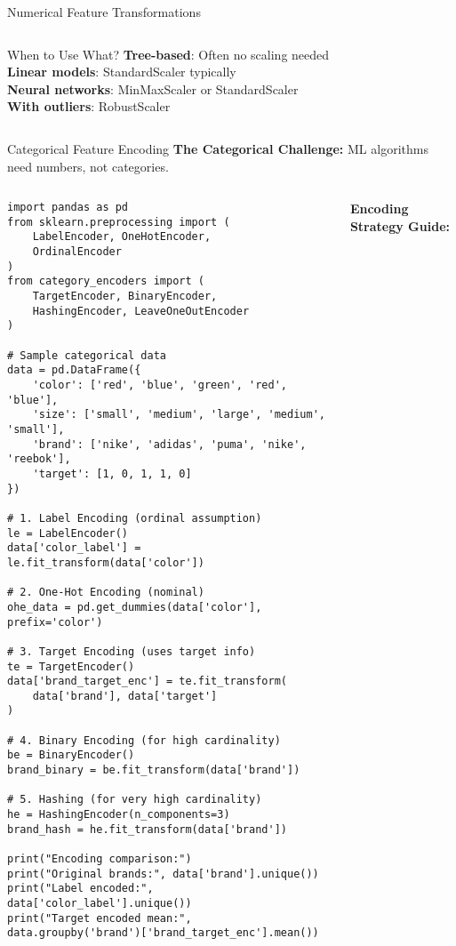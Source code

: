 \documentclass[aspectratio=169,11pt]{beamer}
\begin{document}
\begin{frame}[fragile]{Numerical Feature Transformations}
\begin{columns}
\begin{column}{0.5\textwidth}
\begin{alertblock}{When to Use What?}
\textbf{Tree-based}: Often no scaling needed\\
\textbf{Linear models}: StandardScaler typically\\
\textbf{Neural networks}: MinMaxScaler or StandardScaler\\
\textbf{With outliers}: RobustScaler
\end{alertblock}
\end{column}
\end{columns}
\end{frame}

\begin{frame}[fragile]{Categorical Feature Encoding}
\textbf{The Categorical Challenge:} ML algorithms need numbers, not categories.

\begin{columns}
\begin{column}{0.55\textwidth}
\begin{lstlisting}
import pandas as pd
from sklearn.preprocessing import (
    LabelEncoder, OneHotEncoder, 
    OrdinalEncoder
)
from category_encoders import (
    TargetEncoder, BinaryEncoder,
    HashingEncoder, LeaveOneOutEncoder
)

# Sample categorical data
data = pd.DataFrame({
    'color': ['red', 'blue', 'green', 'red', 'blue'],
    'size': ['small', 'medium', 'large', 'medium', 'small'],
    'brand': ['nike', 'adidas', 'puma', 'nike', 'reebok'],
    'target': [1, 0, 1, 1, 0]
})

# 1. Label Encoding (ordinal assumption)
le = LabelEncoder()
data['color_label'] = le.fit_transform(data['color'])

# 2. One-Hot Encoding (nominal)
ohe_data = pd.get_dummies(data['color'], prefix='color')

# 3. Target Encoding (uses target info)
te = TargetEncoder()
data['brand_target_enc'] = te.fit_transform(
    data['brand'], data['target']
)

# 4. Binary Encoding (for high cardinality)
be = BinaryEncoder()
brand_binary = be.fit_transform(data['brand'])

# 5. Hashing (for very high cardinality)
he = HashingEncoder(n_components=3)
brand_hash = he.fit_transform(data['brand'])

print("Encoding comparison:")
print("Original brands:", data['brand'].unique())
print("Label encoded:", data['color_label'].unique())
print("Target encoded mean:", data.groupby('brand')['brand_target_enc'].mean())
\end{lstlisting}
\end{column}
\begin{column}{0.45\textwidth}
\textbf{Encoding Strategy Guide:}


\end{column}
\end{columns}
\end{frame}
\end{document}
